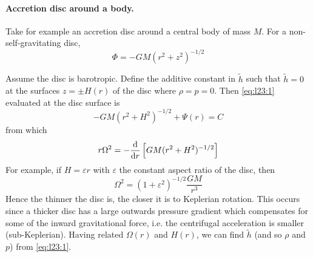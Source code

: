\documentclass{jknotes}
\newcommand{\veps}{\varepsilon}
\begin{document}
\paragraph{Accretion disc around a body.}
Take for example an accretion disc around a central body of mass $M$.  For a
non-self-gravitating disc,
\begin{equation}
	\Phi = -GM(r^2+z^2)^{-1/2}
\end{equation}

\begin{center}
\end{center}

Assume the disc is barotropic. Define the additive constant in $\tilde{h}$
such that $\tilde{h} = 0$ at the surfaces $z = \pm H(r)$ of the disc where
$\rho = p = 0$. Then \eqref{eq:l23:1} evaluated at the disc surface is
\begin{equation}
	-GM(r^2+H^2)^{-1/2} + \Psi(r) = C
\end{equation}
from which
\begin{equation}
	r\Omega^2 = - \frac{\diffd}{\diffd r} \left[ GM(r^2+H^2)^{-1/2}\right]
\end{equation}
For example, if $H = \veps r$ with $\veps$ the constant aspect ratio of the
disc, then
\begin{equation}
	\Omega^2 = (1+\veps^2)^{-1/2} \frac{GM}{r^3}
\end{equation}
Hence the thinner the disc is, the closer it is to Keplerian rotation. This
occurs since a thicker disc has a large outwards pressure gradient which
compensates for some of the inward gravitational force, i.e. the centrifugal
acceleration is smaller (sub-Keplerian). Having related $\Omega(r)$ and
$H(r)$, we can find $\tilde{h}$ (and so $\rho$ and $p$) from \eqref{eq:l23:1}.
\end{document}
